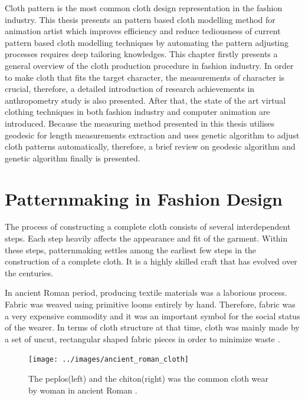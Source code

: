 Cloth pattern is the most common cloth design representation in the fashion industry. This thesis presents an pattern based cloth modelling method for animation artist which improves efficiency and reduce tediousness of current pattern based cloth modelling techniques by automating the pattern adjusting processes requires deep tailoring knowledges. This chapter firstly presents a general overview of the cloth production procedure in fashion industry. In order to make cloth that fits the target character, the measurements of character is crucial, therefore, a detailed introduction of research achievements in anthropometry study is also presented. After that, the state of the art virtual clothing techniques in both fashion industry and computer animation are introduced. Because the measuring method presented in this thesis utilises geodesic for length measurements extraction and uses genetic algorithm to adjust cloth patterns automatically, therefore, a brief review on geodesic algorithm and genetic algorithm finally is presented.


\section{Patternmaking in Fashion Design}

The process of constructing a complete cloth consists of several interdependent steps. Each step heavily affects the appearance and fit of the garment. Within these steps, patternmaking settles among the earliest few steps in the construction of a complete cloth. It is a highly skilled craft that has evolved over the centuries. 

In ancient Roman period, producing textile materials was a laborious process. Fabric was weaved using primitive looms entirely by hand. Therefore, fabric was a very expensive commodity and it was an important symbol for the social status of the wearer. In terms of cloth structure at that time, cloth was mainly made by a set of uncut, rectangular shaped fabric pieces in order to minimize waste  . 

\begin{figure}[ht]
    \centering
	\texttt{[image: ../images/ancient\_roman\_cloth]}\\[1cm]
    \caption{The peplos(left) and the chiton(right) was the common cloth wear by woman in ancient Roman .}
    \label{figure:fig3}
\end{figure}


